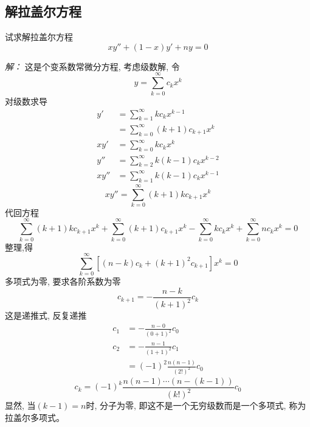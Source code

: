 	\subsection{解拉盖尔方程} 
		\begin{example}
		试求解拉盖尔方程
			\begin{equation*}
				x y''  + (1 -x) y' +n y =0
			\end{equation*}	 
		\end{example}
		\emph{解：}
		这是个变系数常微分方程, 考虑级数解, 令  
		\begin{equation*}
			y=\sum_{k=0}^{\infty} c_k x^k
		\end{equation*}	
		对级数求导
		$$
			\begin{aligned}
				y' &= \sum\limits_{k=1}^{\infty} k c_k x^{k-1} \\ 
					& =\sum\limits_{k=0}^{\infty} (k+1) c_{k+1} x^{k}\\
				xy' &= \sum\limits_{k=0}^{\infty} k c_k x^{k} \\
				y'' &= \sum\limits_{k=2}^{\infty} k (k-1) c_k x^{k-2} \\
				xy''	&=  \sum\limits_{k=1}^{\infty} k (k-1) c_k x^{k-1} 
			\end{aligned}
		$$
		\[		xy'' = \sum\limits_{k=0}^{\infty} (k+1) k c_{k+1} x^{k}\]
		代回方程 
		\[\sum\limits_{k=0}^{\infty} (k+1) k c_{k+1} x^{k} + \sum\limits_{k=0}^{\infty} (k+1) c_{k+1} x^{k} - \sum\limits_{k=0}^{\infty} k c_k x^{k} + \sum_{k=0}^{\infty} n c_k x^k =0\]
		整理,得
		\begin{equation*}
			\sum_{k=0}^{\infty} [(n-k)c_k +(k+1)^2 c_{k+1}  ] x^k =0
		\end{equation*}	
		多项式为零, 要求各阶系数为零
		\begin{equation*}
			c_{k+1}=-\frac{n-k}{(k+1)^2} c_k
		\end{equation*}
		这是递推式, 反复递推
		\begin{equation*}
			\begin{aligned}
				c_{1} &=-\frac{n-0}{(0+1)^2} c_0 \\ 
				c_{2} &=-\frac{n-1}{(1+1)^2} c_1 \\ 
				&= (-1)^2\frac{n(n-1)}{(2!)^2} c_0
			\end{aligned}
		\end{equation*}
		\begin{equation*}
			c_{k}=(-1)^k \frac{n(n-1)\cdots (n-(k-1))}{(k!)^2} c_0
		\end{equation*}	
		显然, 当$(k-1) = n$时, 分子为零, 即这不是一个无穷级数而是一个多项式, 称为拉盖尔多项式。\\ 
